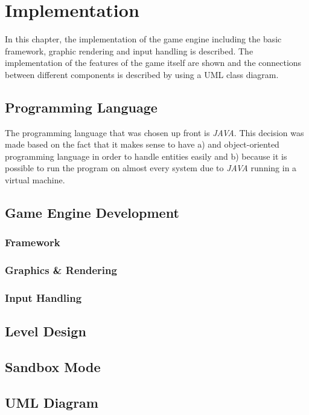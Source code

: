 \section{Implementation}\label{sec:implementation}
In this chapter, the implementation of the game engine including the basic framework, graphic rendering and input handling is described.
The implementation of the features of the game itself are shown and the connections between different components is described by using a
UML class diagram.
\subsection{Programming Language}\label{subsec:programming-language}
The programming language that was chosen up front is \textit{JAVA}.
This decision was made based on the fact that it makes sense to have a) and object-oriented programming language in order to
handle entities easily and b) because it is possible to run the program on almost every system due to \textit{JAVA} running
in a virtual machine.
\subsection{Game Engine Development}\label{subsec:game-engine-development}
\subsubsection{Framework}
\subsubsection{Graphics \& Rendering}
\subsubsection{Input Handling}
\subsection{Level Design}\label{subsec:level-design}
\subsection{Sandbox Mode}\label{subsec:sandbox-mode}
\subsection{UML Diagram}\label{subsec:uml-diagram}